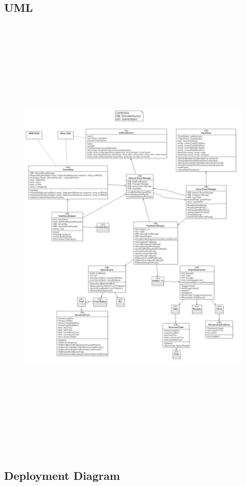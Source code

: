 \documentclass [12pt]{article}
\begin{document}
\subsection{UML}

 \begin{figure}[ht!]
\centering
\includegraphics[height=22cm,width=16cm]{UML.jpg}
\end{figure}

\clearpage
\subsection{Deployment Diagram}
\end{document}
